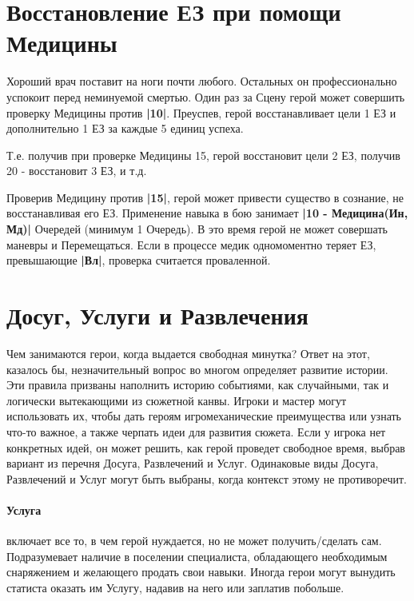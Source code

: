 \section{Восстановление ЕЗ при помощи Медицины}
Хороший врач поставит на ноги почти любого. Остальных он профессионально успокоит перед неминуемой смертью.
\newline Один раз за Сцену герой может совершить проверку Медицины против \textbf{|10|}. Преуспев, герой восстанавливает цели 1 ЕЗ и дополнительно 1 ЕЗ за каждые 5 единиц успеха.
\begin{tcolorbox}
  Т.е. получив при проверке Медицины 15, герой восстановит цели 2 ЕЗ, получив 20 - восстановит 3 ЕЗ, и т.д.
\end{tcolorbox}
Проверив Медицину против \textbf{|15|}, герой может привести существо в сознание, не восстанавливая его ЕЗ. 
\newline Применение навыка в бою занимает \textbf{|10 - Медицина(Ин, Мд)|} Очередей (минимум 1 Очередь). В это время герой не может совершать маневры и Перемещаться. Если в процессе медик одномоментно теряет ЕЗ, превышающие \textbf{|Вл|}, проверка считается проваленной. 

\section{Досуг, Услуги и Развлечения}
Чем занимаются герои, когда выдается свободная минутка? Ответ на этот, казалось бы, незначительный вопрос во многом определяет развитие истории. 
\newline Эти правила призваны наполнить историю событиями, как случайными, так и логически вытекающими из сюжетной канвы. Игроки и мастер могут использовать их, чтобы дать героям игромеханические преимущества или узнать что-то важное, а также черпать идеи для развития сюжета. 
\newline Если у игрока нет конкретных идей, он может решить, как герой проведет свободное время, выбрав вариант из перечня Досуга, Развлечений и Услуг. Одинаковые виды Досуга, Развлечений и Услуг могут быть выбраны, когда контекст этому не противоречит.

\paragraph{Услуга} включает все то, в чем герой нуждается, но не может получить/сделать сам. Подразумевает наличие в поселении специалиста, обладающего необходимым снаряжением и желающего продать свои навыки. Иногда герои могут вынудить статиста оказать им Услугу, надавив на него или заплатив побольше.
